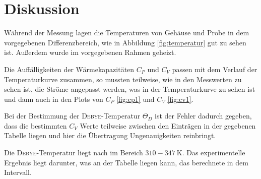 \section{Diskussion}
\label{sec:Diskussion}
Während der Messung lagen die Temperaturen von Gehäuse und Probe in dem
vorgegebenen Differenzbereich, wie in Abbildung \ref{fig:temperatur} gut zu sehen ist.
Außerdem wurde im vorgegebenen Rahmen geheizt.

Die Auffälligkeiten der Wärmekapazitäten $C_P$ und $C_V$ passen mit dem Verlauf
der Temperaturkurve zusammen, so mussten teilweise, wie in den Messwerten zu sehen ist,
die Ströme angepasst werden, was in der Temperaturkurve zu sehen ist und dann auch in den
Plots von $C_P$ \ref{fig:cp1} und $C_V$ \ref{fig:cv1}.

Bei der Bestimmung der \textsc{Debye}-Temperatur $Θ_D$ ist der Fehler dadurch gegeben,
dass die bestimmten $C_V$ Werte teilweise zwischen den Einträgen in der
gegebenen Tabelle liegen und hier die Übertragung Ungenauigkeiten reinbringt.

Die \textsc{Debye}-Temperatur liegt nach \cite{debye-copper} im Bereich
$310 - \SI{347}{\kelvin}$. Das experimentelle Ergebnis liegt darunter, was an
der Tabelle liegen kann, das berechnete in dem Intervall.

